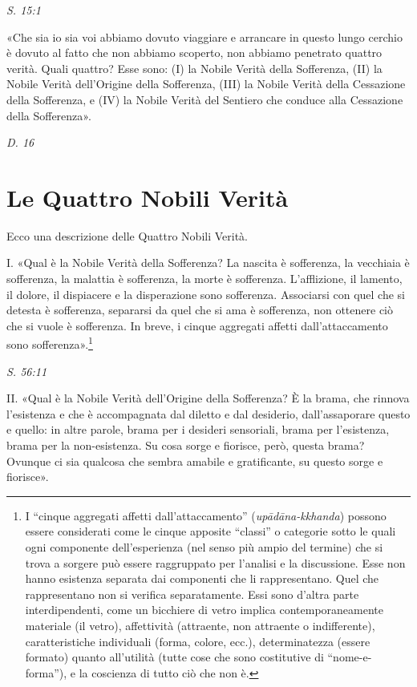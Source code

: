 \emph{S. 15:1}


«Che sia io sia voi abbiamo dovuto viaggiare e arrancare in questo lungo
cerchio è dovuto al fatto che non abbiamo scoperto, non abbiamo
penetrato quattro verità. Quali quattro? Esse sono: (I) la Nobile Verità
della Sofferenza, (II) la Nobile Verità dell’Origine della Sofferenza,
(III) la Nobile Verità della Cessazione della Sofferenza, e (IV) la
Nobile Verità del Sentiero che conduce alla Cessazione della
Sofferenza».


\emph{D. 16}


\hypertarget{x-le-quattro-nobili-verità}{\section*{Le Quattro Nobili Verità}}
 Ecco una descrizione delle Quattro Nobili Verità.


 I. «Qual è la Nobile Verità della Sofferenza? La nascita è
sofferenza, la vecchiaia è sofferenza, la malattia è sofferenza, la
morte è sofferenza. L’afflizione, il lamento, il dolore, il dispiacere e
la disperazione sono sofferenza. Associarsi con quel che si detesta è
sofferenza, separarsi da quel che si ama è sofferenza, non ottenere ciò
che si vuole è sofferenza. In breve, i cinque aggregati affetti
dall’attaccamento sono sofferenza».\footnote{I “cinque aggregati affetti dall’attaccamento” (\emph{upādāna-kkhanda}) possono essere considerati come le cinque apposite “classi” o categorie sotto le quali ogni componente dell’esperienza (nel senso più ampio del termine) che si trova a sorgere può essere raggruppato per l’analisi e la discussione. Esse non hanno esistenza separata dai componenti che li rappresentano. Quel che rappresentano non si verifica separatamente. Essi sono d’altra parte interdipendenti, come un bicchiere di vetro implica contemporaneamente materiale (il vetro), affettività (attraente, non attraente o indifferente), caratteristiche individuali (forma, colore, ecc.), determinatezza (essere formato) quanto all’utilità (tutte cose che sono costitutive di “nome-e-forma”), e la coscienza di tutto ciò che non è.}


\emph{S. 56:11}


II. «Qual è la Nobile Verità dell’Origine della Sofferenza? È la brama,
che rinnova l’esistenza e che è accompagnata dal diletto e dal
desiderio, dall’assaporare questo e quello: in altre parole, brama per i
desideri sensoriali, brama per l’esistenza, brama per la non-esistenza.
Su cosa sorge e fiorisce, però, questa brama? Ovunque ci sia qualcosa
che sembra amabile e gratificante, su questo sorge e fiorisce».


